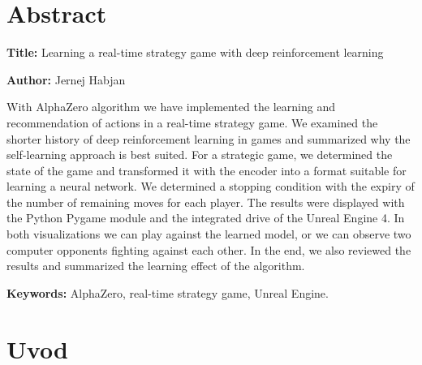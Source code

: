 \documentclass[a4paper, 12pt]{book}
\newcommand{\ttitleEn}{Learning a real-time strategy game with deep reinforcement learning}
\newcommand{\tauthor}{Jernej Habjan}
\newcommand{\tkeywordsEn}{AlphaZero, real-time strategy game, Unreal Engine}
\newcommand{\clearemptydoublepage}{\newpage{\pagestyle{empty}\cleardoublepage}}
\begin{document}
\chapter*{Abstract}

\noindent\textbf{Title:} \ttitleEn
\bigskip

\noindent\textbf{Author:} \tauthor
\bigskip

\noindent With AlphaZero algorithm we have implemented the learning and recommendation of actions in a real-time strategy game.
We examined the shorter history of deep reinforcement learning in games and summarized why the self-learning approach is best suited.
For a strategic game, we determined the state of the game and transformed it with the encoder into a format suitable for learning a neural network.
We determined a stopping condition with the expiry of the number of remaining moves for each player.
The results were displayed with the Python Pygame module and the integrated drive of the Unreal Engine 4.
In both visualizations we can play against the learned model, or we can observe two computer opponents fighting against each other.
In the end, we also reviewed the results and summarized the learning effect of the algorithm.
\bigskip

\noindent\textbf{Keywords:} \tkeywordsEn.
\clearemptydoublepage

\mainmatter
\setcounter{page}{1}
\pagestyle{fancy}



\chapter{Uvod}
\end{document}
